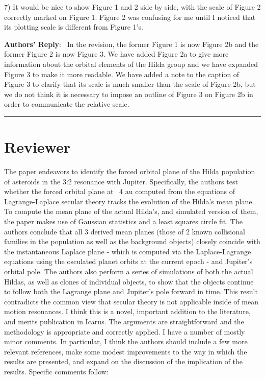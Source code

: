 \documentclass[11pt]{article}
\newcounter{reviewer}
\newcommand{\reviewersection}{\stepcounter{reviewer} \bigskip \hrule
                  \section*{Reviewer \thereviewer}}
\newenvironment{reply}
   {\medskip \noindent \begin{sf}\textbf{Authors' Reply}:\  }
   {\medskip \end{sf}\medskip}
\newcommand{\edit}[1]{{\color{red}#1}}
\begin{document}
7) It would be nice to show Figure 1 and 2 side by side, with the scale of Figure 2 correctly marked on Figure 1. Figure 2 was confusing for me until I noticed that its plotting scale is different from Figure 1's.


\begin{reply}
In the revision, the former Figure 1 is now Figure 2b and the former Figure 2 is now Figure 3. We have added Figure 2a to give more information about the orbital elements of the Hilda group and we have expanded Figure 3 to make it more readable. We have added a note to the caption of Figure 3 to clarify that its scale is much smaller than the scale of Figure 2b, but we do not think it is necessary to impose an outline of Figure 3 on Figure 2b in order to communicate the relative scale.
\end{reply}

\reviewersection

The paper endeavors to identify the forced orbital plane of the Hilda population of asteroids in the 3:2 resonance with Jupiter. Specifically, the authors test whether the forced orbital plane at ~4 au computed from the equations of Lagrange-Laplace secular theory tracks the evolution of the Hilda's mean plane. To compute the mean plane of the actual Hilda's, and simulated version of them, the paper makes use of Gaussian statistics and a least squares circle fit. The authors conclude that all 3 derived mean planes (those of 2 known collisional families in the population as well as the background objects) closely coincide with the instantaneous Laplace plane - which is computed via the Laplace-Lagrange equations using the osculated planet orbits at the current epoch - and Jupiter's orbital pole. The authors also perform a series of simulations of both the actual Hildas, as well as clones of individual objects, to show that the objects continue to follow both the Lagrange plane and Jupiter's pole forward in time. This result contradicts the common view that secular theory is not applicable inside of mean motion resonances. I think this is a novel, important addition to the literature, and merits publication in Icarus. The arguments are straightforward and the methodology is appropriate and correctly applied. I have a number of mostly minor comments. In particular, I think the authors should include a few more relevant references, make some modest improvements to the way in which the results are presented, and expand on the discussion of the implication of the results. Specific comments follow:
\end{document}
